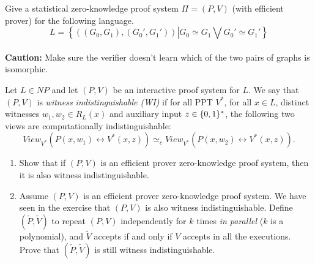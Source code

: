 \begin{exercise} Give a statistical zero-knowledge proof system $\Pi = (P,V)$ (with efficient prover) for the following language.
    \[ L = \left\{((G_0,G_1),(G_0',G_1'))\left| G_0 \simeq G_1 \bigvee G_0' \simeq G_1'\right.\right\}\]\\
    \textbf{Caution:} Make sure the verifier doesn't learn which of the two pairs of graphs is isomorphic.
\end{exercise}

\begin{exercise} [ZK implies WI] Let $L \in NP$ and let $(P,V)$ be an interactive proof system for $L$. We say that $(P,V)$ is \emph{witness indistinguishable (WI)} if for all PPT $V^*$, for all $x \in L$, distinct witnesses $w_1, w_2 \in R_L(x)$ and  auxiliary input $z\in \{0,1\}^{*}$, the following two views are computationally indistinguishable:
\[View_{V^*} \left(P(x,w_1) \leftrightarrow V^*(x,z) \right) \simeq_c View_{V^*} \left(P(x,w_2) \leftrightarrow V^*(x,z) \right).\]
\begin{enumerate}
\item Show that if $(P,V)$ is an efficient prover zero-knowledge proof system, then it is also witness indistinguishable.

\item Assume $(P,V)$ is an efficient prover zero-knowledge proof system. We have seen in the exercise that $(P,V)$ is also witness indistinguishable. Define $(\tilde P, \tilde V)$ to repeat $(P,V)$ independently for $k$ times \emph{in parallel} ($k$ is a polynomial), and $\tilde V$ accepts if and only if $V$ accepts in all the executions. Prove that $(\tilde P, \tilde V)$ is still witness indistinguishable.
\end{enumerate}    
\end{exercise}

